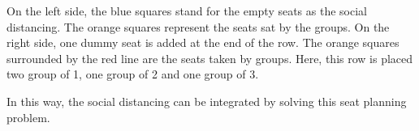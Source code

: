 On the left side, the blue squares stand for the empty seats as the social distancing. The orange squares represent the seats sat by the groups. 
On the right side, one dummy seat is added at the end of the row. The orange squares surrounded by the red line are the seats taken by groups. Here, this row is placed two group of 1, one group of 2 and one group of 3.

In this way, the social distancing can be integrated by solving this seat planning problem.








